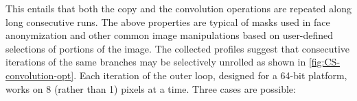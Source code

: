 \ifdefined\noauthorea
\begin{figure}[!t]
\begingroup\setlength{\fboxsep}{0pt}
\centerline{}
\vspace{2.5mm}
\centerline{}
\vspace{2.5mm}
\centerline{}
\endgroup
\caption{\protect}
\end{figure}
\fi

\noindent This entails that both the copy and the convolution operations are repeated along long consecutive runs. The above properties are typical of masks used in face anonymization and other common image manipulations based on user-defined selections of portions of the image. The collected profiles suggest that consecutive iterations of the same branches may be selectively unrolled as shown in \myfigure\ref{fig:CS-convolution-opt}. Each iteration of the outer loop, designed for a 64-bit platform, works on 8 (rather than 1) pixels at a time. Three cases are possible:

